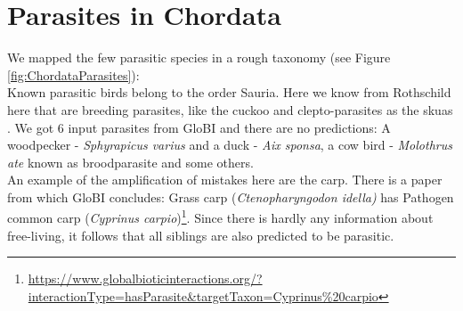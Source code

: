   \section{Parasites in Chordata} \label{sec:parasites in chordata}
    We mapped the few parasitic species in a rough taxonomy (see Figure \ref{fig:ChordataParasites}): \\
    Known parasitic birds belong to the order Sauria. Here we know from Rothschild here that are 
      breeding parasites, like the cuckoo and clepto-parasites as the skuas \cite{Rothschild1957}. We
      got 6 input parasites from GloBI and there are no predictions: A woodpecker - 
      \textit{Sphyrapicus varius} and a duck - \textit{Aix sponsa}, a cow bird - \textit{Molothrus ate} 
      known as broodparasite and some others. \\
    An example of the amplification of mistakes here are the carp. There is a paper from which GloBI 
      concludes: Grass carp (\textit{Ctenopharyngodon idella)} has Pathogen common carp 
      (\textit{Cyprinus carpio})\footnote{
        \hyperlink{https://www.globalbioticinteractions.org/?interactionType=hasParasite&targetTaxon=Cyprinus\%20carpio}
        {https://www.globalbioticinteractions.org/?interactionType=hasParasite\&targetTaxon=Cyprinus\%20carpio}
      }. Since there is hardly any information about free-living, it follows that all siblings are 
      also predicted to be parasitic.

